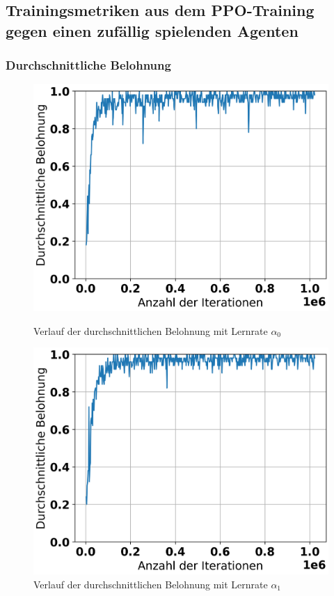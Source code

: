 \subsection{Trainingsmetriken aus dem PPO-Training gegen einen zufällig spielenden Agenten}

\label{appendix-training-random}

\subsubsection{Durchschnittliche Belohnung}

\begin{figure}[H]
	\begin{minipage}[c]{0.48\linewidth}
		\includegraphics[width=\linewidth]{Bilder/random-training/history_random_0_003_graph_episode_rewards.png}
		\caption{Verlauf der durchschnittlichen Belohnung mit Lernrate $\alpha_0$}
	\end{minipage}
	\hfill
	\begin{minipage}[c]{0.48\linewidth}
		\includegraphics[width=\linewidth]{Bilder/random-training/history_random_0_001_graph_episode_rewards.png}
		\caption{Verlauf der durchschnittlichen Belohnung mit Lernrate $\alpha_1$}
	\end{minipage}
\end{figure}


